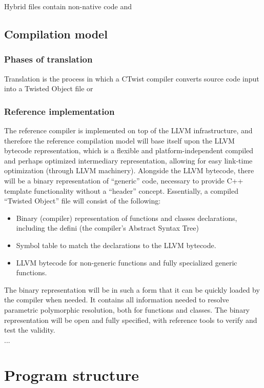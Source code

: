 \documentclass[a4paper,11pt]{article}
\begin{document}
Hybrid files contain non-native code and 

  \subsection{Compilation model}
    \subsubsection{Phases of translation}

Translation is the process in which a CTwist compiler converts source code input into a Twisted Object file or 

    \subsubsection{Reference implementation}

The reference compiler is implemented on top of the LLVM infrastructure, and therefore the reference compilation model will base itself upon the LLVM bytecode representation, which is a flexible and platform-independent compiled and perhaps optimized intermediary representation, allowing for easy link-time optimization (through LLVM machinery).
Alongside the LLVM bytecode, there will be a binary representation of “generic” code, necessary to provide C++ template functionality without a “header” concept.
Essentially, a compiled “Twisted Object” file will consist of the following:
\begin{itemize}
  \item Binary (compiler) representation of functions and classes declarations, including the defini (the compiler’s Abstract Syntax Tree)
  \item Symbol table to match the declarations to the LLVM bytecode.
  \item LLVM bytecode for non-generic functions and fully specialized generic functions.
\end{itemize}
The binary representation will be in such a form that it can be quickly loaded by the compiler when needed.
It contains all information needed to resolve parametric polymorphic resolution, both for functions and classes.
The binary representation will be open and fully specified, with reference tools to verify and test the validity.
\\ ...

\section{Program structure}
\end{document}
